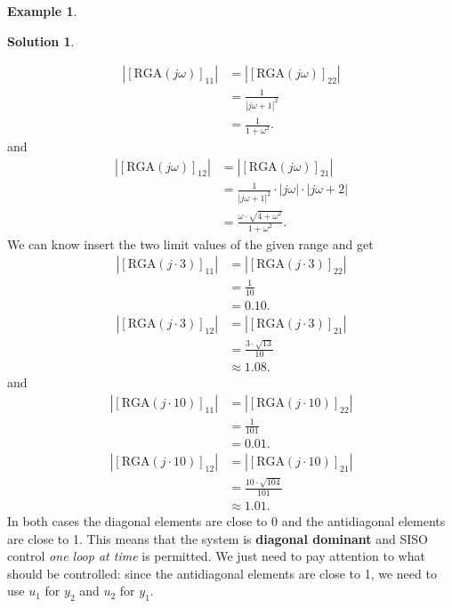 \documentclass[a4paper,12 pt]{article}
\numberwithin{equation}{section}
\theoremstyle{definition}
\newtheorem{bsp}{Example}
\theoremstyle{remark}
\theoremstyle{definition}
\newtheorem*{lsg}{Solution}
\theoremstyle{definition}
\theoremstyle{definition}
\theoremstyle{remark}
\begin{document}
\begin{bsp}
\begin{lsg}
\begin{enumerate}[(a)]
\begin{equation*}
\begin{split}
|[\text{RGA}(j\omega)]_{11}|&=|[\text{RGA}(j\omega)]_{22}|\\
&=\frac{1}{|j\omega+1|^2}\\
&=\frac{1}{1+\omega^2}.
\end{split}
\end{equation*}
and
\begin{equation*}
\begin{split}
|[\text{RGA}(j\omega)]_{12}|&=|[\text{RGA}(j\omega)]_{21}|\\
&=\frac{1}{|j\omega+1|^2}\cdot |j\omega| \cdot |j\omega+2|\\
&=\frac{\omega \cdot \sqrt{4+\omega^2}}{1+\omega^2}.
\end{split}
\end{equation*}
We can know insert the two limit values of the given range and get
\begin{equation*}
\begin{split}
|[\text{RGA}(j\cdot 3)]_{11}|&=|[\text{RGA}(j\cdot 3)]_{22}|\\
&=\frac{1}{10}\\
&=0.10.\\
|[\text{RGA}(j\cdot 3)]_{12}|&=|[\text{RGA}(j\cdot 3)]_{21}|\\
&=\frac{3\cdot \sqrt{13}}{10}\\
&\approx 1.08.
\end{split}
\end{equation*}
and
\begin{equation*}
\begin{split}
|[\text{RGA}(j\cdot 10)]_{11}|&=|[\text{RGA}(j\cdot 10)]_{22}|\\
&=\frac{1}{101}\\
&=0.01.\\
|[\text{RGA}(j\cdot 10)]_{12}|&=|[\text{RGA}(j\cdot 10)]_{21}|\\
&=\frac{10\cdot \sqrt{104}}{101}\\
&\approx 1.01.
\end{split}
\end{equation*}
In both cases the diagonal elements are close to 0 and the antidiagonal elements are close to 1. This means that the system is \textbf{diagonal dominant} and SISO control \textit{one loop at time} is permitted. We just need to pay attention to what should be controlled: since the antidiagonal elements are close to 1, we need to use $u_1$ for $y_2$ and $u_2$ for $y_1$.
\end{enumerate}


\end{lsg}

\end{bsp}
\end{document}
